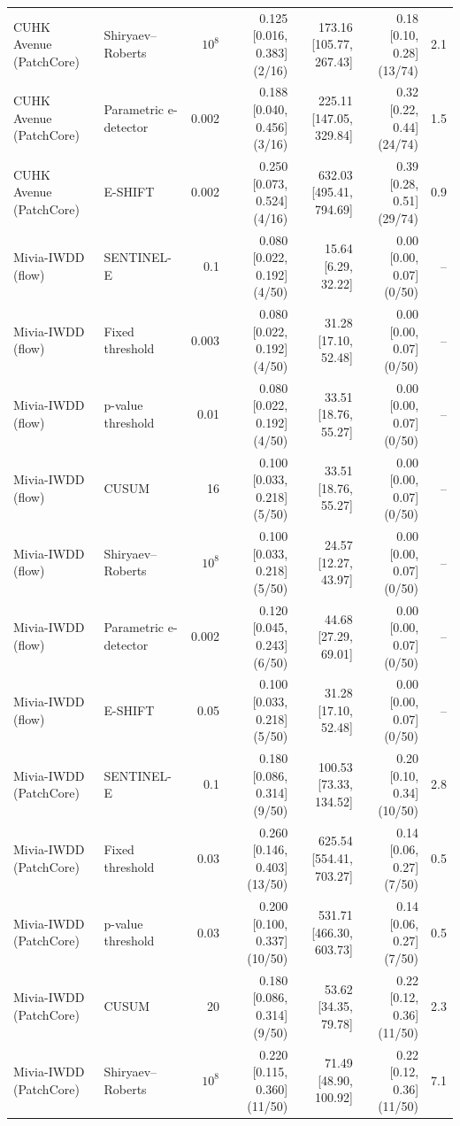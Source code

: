 \begin{table}[t]
{\begin{tabular}{llrrrrr}
CUHK Avenue (PatchCore) & Shiryaev--Roberts & $10^{8}$ & 0.125 [0.016, 0.383] (2/16) & 173.16 [105.77, 267.43] & 0.18 [0.10, 0.28] (13/74) & 2.1 \\
CUHK Avenue (PatchCore) & Parametric e-detector & 0.002 & 0.188 [0.040, 0.456] (3/16) & 225.11 [147.05, 329.84] & 0.32 [0.22, 0.44] (24/74) & 1.5 \\
CUHK Avenue (PatchCore) & E-SHIFT & 0.002 & 0.250 [0.073, 0.524] (4/16) & 632.03 [495.41, 794.69] & 0.39 [0.28, 0.51] (29/74) & 0.9 \\
Mivia-IWDD (flow) & SENTINEL-E & 0.1 & 0.080 [0.022, 0.192] (4/50) & 15.64 [6.29, 32.22] & 0.00 [0.00, 0.07] (0/50) & -- \\
Mivia-IWDD (flow) & Fixed threshold & 0.003 & 0.080 [0.022, 0.192] (4/50) & 31.28 [17.10, 52.48] & 0.00 [0.00, 0.07] (0/50) & -- \\
Mivia-IWDD (flow) & p-value threshold & 0.01 & 0.080 [0.022, 0.192] (4/50) & 33.51 [18.76, 55.27] & 0.00 [0.00, 0.07] (0/50) & -- \\
Mivia-IWDD (flow) & CUSUM & 16 & 0.100 [0.033, 0.218] (5/50) & 33.51 [18.76, 55.27] & 0.00 [0.00, 0.07] (0/50) & -- \\
Mivia-IWDD (flow) & Shiryaev--Roberts & $10^{8}$ & 0.100 [0.033, 0.218] (5/50) & 24.57 [12.27, 43.97] & 0.00 [0.00, 0.07] (0/50) & -- \\
Mivia-IWDD (flow) & Parametric e-detector & 0.002 & 0.120 [0.045, 0.243] (6/50) & 44.68 [27.29, 69.01] & 0.00 [0.00, 0.07] (0/50) & -- \\
Mivia-IWDD (flow) & E-SHIFT & 0.05 & 0.100 [0.033, 0.218] (5/50) & 31.28 [17.10, 52.48] & 0.00 [0.00, 0.07] (0/50) & -- \\
Mivia-IWDD (PatchCore) & SENTINEL-E & 0.1 & 0.180 [0.086, 0.314] (9/50) & 100.53 [73.33, 134.52] & 0.20 [0.10, 0.34] (10/50) & 2.8 \\
Mivia-IWDD (PatchCore) & Fixed threshold & 0.03 & 0.260 [0.146, 0.403] (13/50) & 625.54 [554.41, 703.27] & 0.14 [0.06, 0.27] (7/50) & 0.5 \\
Mivia-IWDD (PatchCore) & p-value threshold & 0.03 & 0.200 [0.100, 0.337] (10/50) & 531.71 [466.30, 603.73] & 0.14 [0.06, 0.27] (7/50) & 0.5 \\
Mivia-IWDD (PatchCore) & CUSUM & 20 & 0.180 [0.086, 0.314] (9/50) & 53.62 [34.35, 79.78] & 0.22 [0.12, 0.36] (11/50) & 2.3 \\
Mivia-IWDD (PatchCore) & Shiryaev--Roberts & $10^{8}$ & 0.220 [0.115, 0.360] (11/50) & 71.49 [48.90, 100.92] & 0.22 [0.12, 0.36] (11/50) & 7.1 \\

\end{tabular}}
\end{table}
